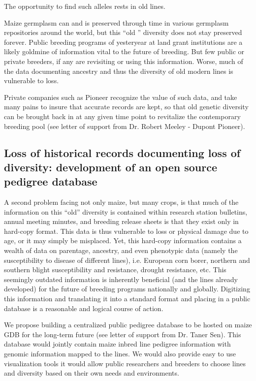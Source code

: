 \documentclass[12pt]{article}
\begin{document}
The opportunity to find such alleles rests in old lines. 
\par Maize germplasm can and is preserved through time in various germplasm repositories around the world, but this ``old '' diversity  does not stay preserved forever. Public breeding programs of yesteryear at land grant institutions are a likely goldmine of information vital to the future of breeding. But few public or private breeders, if any are revisiting or using this information. Worse, much of the data documenting ancestry and thus the diversity of old modern lines is vulnerable to loss. 
\par Private companies such as Pioneer recognize the value of such data, and take many pains to insure that accurate records are kept, so that old genetic diversity can be brought back in at any given time point to revitalize the contemporary breeding pool (see letter of support from Dr. Robert Meeley - Dupont Pioneer).

\subsection{Loss of historical records documenting loss of diversity: development of an open source pedigree database}
A second problem facing not only maize, but many crops, is that much of the information on this ``old'' diversity is contained within research station bulletins, annual meeting minutes, and breeding release sheets is that they exist only in hard-copy format. This data is thus vulnerable to loss or physical damage due to age, or it may simply be misplaced. Yet, this hard-copy information contains a wealth of data on parentage, ancestry, and even phenotypic data (namely the susceptibility to disease of different lines), i.e. European corn borer, northern and southern blight susceptibility and resistance, drought resistance, etc. This seemingly outdated information is inherently beneficial (and the lines already developed) for the future of breeding programs nationally and globally. Digitizing this information and translating it into a standard format and placing in a public database is a reasonable and logical course of action.
\par We propose building a centralized public pedigree database to be hosted on maize GDB for the long-term future (see letter of support from Dr. Taner Sen). This database would jointly contain maize inbred line pedigree information with genomic information mapped to the lines. We would also provide easy to use visualization tools it would allow public researchers and breeders to choose lines and diversity based on their own needs and environments. 
\end{document}
